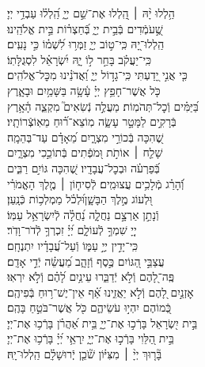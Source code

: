 \documentclass[twoside, openany, parskip=half, 11pt]{book}
\begin{document}
\begin{narrow}
הַ֥לְלוּ יָ֨הּ ׀ \hfill \break
הַֽ֭לְלוּ אֶת־שֵׁ֣ם יְיָ֑ \hfill הַֽ֝לְל֗וּ עַבְדֵ֥י יְיָ׃ \\
שֶׁ֣֭עֹמְֿדִים בְּֿבֵ֣ית יְיָ֑ \hfill בְּֿ֝חַצְר֗וֹת בֵּ֣ית אֱלֹהֵֽינוּ׃ \\
הַֽלְלוּ־יָ֭הּ כִּֽי־ט֣וֹב יְיָ֑ \hfill זַמְּר֥וּ לִ֝שְׁמ֗וֹ כִּ֣י נָעִֽים׃ \\
כִּֽי־יַעֲקֹ֗ב בָּחַ֣ר ל֣וֹ יָ֑הּ \hfill יִ֝שְׂרָאֵ֗ל לִסְגֻלָּתֽוֹ׃ \\
כִּ֤י אֲנִ֣י יָ֭דַעְתִּי כִּֽי־גָד֣וֹל יְיָ֑ \hfill וַ֝אֲדֹנֵ֗ינוּ מִכׇּל־אֱלֹהִֽים׃ \\
כֹּ֤ל אֲשֶׁר־חָפֵ֥ץ יְיָ֗ עָ֫שָׂ֥ה \hfill בַּשָּׁמַ֥יִם וּבָאָ֑רֶץ\\ בַּ֝יַּמִּ֗ים וְֿכׇל־תְּהֹמֽוֹת׃ \hfill
מַעֲלֶ֣ה נְֿשִׂאִים֮ מִקְצֵ֢ה הָ֫אָ֥רֶץ\\ בְּֿרָקִ֣ים לַמָּטָ֣ר עָשָׂ֑ה \hfill מֽוֹצֵא־ר֗֝וּחַ מֵאֽוֹצְֿרוֹתָֽיו׃ \\
שֶׁ֭הִכָּה בְּֿכוֹרֵ֣י מִצְרָ֑יִם \hfill מֵ֝אָדָ֗ם עַד־בְּהֵמָֽה׃ \\
שָׁלַ֤ח ׀ אוֹתֹ֣ת וּ֭מֹפְֿתִים \hfill בְּֿתוֹכֵ֣כִי מִצְרָ֑יִם\\ בְּֿ֝פַרְעֹ֗ה וּבְכׇל־עֲבָדָֽיו׃ \hfill
שֶׁ֭הִכָּה גּוֹיִ֣ם רַבִּ֑ים\\ וְֿ֝הָרַ֗ג מְֿלָכִ֥ים עֲצוּמִֽים׃ \hfill
לְֿסִיח֤וֹן ׀ מֶ֤לֶךְ הָאֱמֹרִ֗י\\ וּ֭לְעוֹג מֶ֣לֶךְ הַבָּשָׁ֑ן\hfill וּ֝לְכֹ֗ל מַמְלְכ֥וֹת כְּֿנָֽעַן׃ \\
וְֿנָתַ֣ן אַרְצָ֣ם נַחֲלָ֑ה \hfill נַ֝חֲלָ֗ה לְֿיִשְׂרָאֵ֥ל עַמּֽוֹ׃ \\
יְיָ֭ שִׁמְךָ֣ לְֿעוֹלָ֑ם \hfill יְ֝יָ֗ זִכְרְךָ֥ לְֿדֹר־וָדֹֽר׃ \\
כִּֽי־יָדִ֣ין יְיָ֣ עַמּ֑וֹ \hfill וְֿעַל־עֲ֝בָדָ֗יו יִתְנֶחָֽם׃ \\
עֲצַבֵּ֣י הַ֭גּוֹיִם כֶּ֣סֶף וְֿזָהָ֑ב \hfill מַ֝עֲשֵׂ֗ה יְֿדֵ֣י אָדָֽם׃ \\
פֶּֽה־לָ֭הֶם וְֿלֹ֣א יְֿדַבֵּ֑רוּ \hfill עֵינַ֥יִם לָ֝הֶ֗ם וְֿלֹ֣א יִרְאֽוּ׃ \\
אׇזְנַ֣יִם לָ֭הֶם וְֿלֹ֣א יַאֲזִ֑ינוּ \hfill אַ֗֝ף אֵין־יֶשׁ־ר֥וּחַ בְּֿפִיהֶֽם׃ \\
כְּֿ֭מוֹהֶם יִהְי֣וּ עֹשֵׂיהֶ֑ם \hfill כֹּ֖ל אֲשֶׁר־בֹּטֵ֣חַ בָּהֶֽם׃ \\
בֵּ֣ית יִ֭שְׂרָאֵל בָּרְֿכ֣וּ אֶת־יְיָ֑ \hfill בֵּ֥ית אַ֝הֲרֹ֗ן בָּרְֿכ֥וּ אֶת־יְיָ׃ \\
בֵּ֣ית הַ֭לֵּוִי בָּרְֿכ֣וּ אֶת־יְיָ֑ \hfill יִֽרְאֵ֥י יְ֝יָ֗ בָּרְֿכ֥וּ אֶת־יְיָ׃ \\
בָּ֘ר֤וּךְ יְיָ֨ ׀ מִצִּיּ֗וֹן שֹׁ֘כֵ֤ן יְֽֿרוּשָׁלָ֗‍ִם \hfill הַֽלְלוּ־יָֽהּ׃ \\



\end{narrow}
\end{document}
